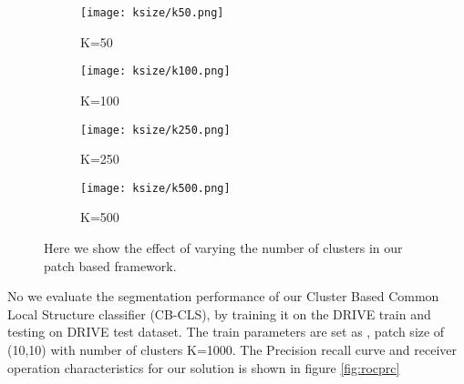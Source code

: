 \begin{figure}
	\begin{subfigure}[b]{0.45\textwidth}
		\texttt{[image: ksize/k50.png]}
		\caption{K=50}
		\label{fig:k50}
	\end{subfigure}
	\begin{subfigure}[b]{0.45\textwidth}
		\texttt{[image: ksize/k100.png]}
		\caption{K=100}
		\label{fig:k100}
	\end{subfigure}
	
	\begin{subfigure}[b]{0.45\textwidth}
		\texttt{[image: ksize/k250.png]}
		\caption{K=250}
		\label{fig:k250}
	\end{subfigure}
	\begin{subfigure}[b]{0.45\textwidth}
		\texttt{[image: ksize/k500.png]}
		\caption{K=500}
		\label{fig:k500}
	\end{subfigure}
	\caption[Image segmentation using varying the number of clusters]{Here we show the effect of varying the number of clusters in our patch based framework.}
	\label{fig:ksize}
\end{figure}

No we evaluate the segmentation performance of our Cluster Based Common Local Structure classifier (CB-CLS), by training it on the DRIVE train and testing on DRIVE test dataset. The train parameters are set as , patch size of (10,10) with number of clusters K=1000.
The Precision recall curve and receiver operation characteristics for our solution is shown in figure \ref{fig:rocprc}\\

